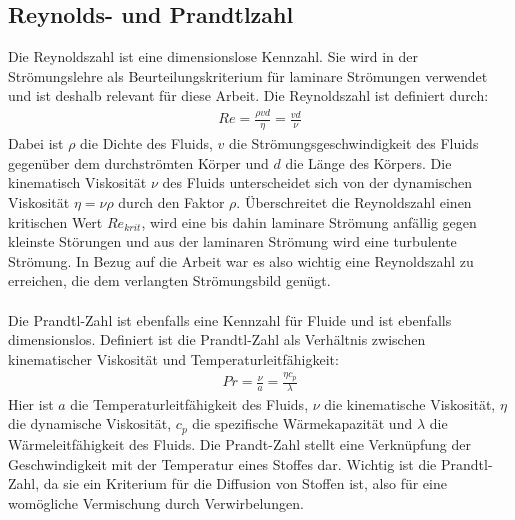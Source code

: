 \subsection{Reynolds- und Prandtlzahl}
Die Reynoldszahl ist eine dimensionslose Kennzahl. Sie wird in der Str\"{o}mungslehre als Beurteilungskriterium f\"{u}r laminare Str\"{o}mungen verwendet und ist deshalb relevant f\"{u}r diese Arbeit. Die Reynoldszahl ist definiert durch:
\begin{align*}
{Re} = \frac{\rho vd}{\eta} = \frac{vd}{\nu}
\end{align*}
Dabei ist \(\rho\) die Dichte des Fluids, \(v\) die Str\"{o}mungsgeschwindigkeit des Fluids gegen\"{u}ber dem durchstr\"{o}mten K\"{o}rper und \(d\) die L\"{a}nge des K\"{o}rpers. Die kinematisch Viskosit\"{a}t \(\nu\) des Fluids unterscheidet sich von der dynamischen Viskosit\"{a}t \(\eta = \nu \rho\) durch den Faktor \(\rho\). \"{U}berschreitet die Reynoldszahl einen kritischen Wert \({Re}_{krit}\), wird eine bis dahin laminare Str\"{o}mung anf\"{a}llig gegen kleinste St\"{o}rungen und aus der laminaren Str\"{o}mung wird eine turbulente Str\"{o}mung. In Bezug auf die Arbeit war es also wichtig eine Reynoldszahl zu erreichen, die dem verlangten Str\"{o}mungsbild gen\"{u}gt\cite{reynolds}.
\\\\
Die Prandtl-Zahl ist ebenfalls eine Kennzahl f\"{u}r Fluide und ist ebenfalls dimensionslos. Definiert ist die Prandtl-Zahl als Verh\"{a}ltnis zwischen kinematischer Viskosit\"{a}t und Temperaturleitf\"{a}higkeit:
\begin{align*}
{Pr} = \frac{\nu}{a} = \frac{\eta c_p}{\lambda}
\end{align*}
Hier ist \(a\) die Temperaturleitf\"{a}higkeit des Fluids, \(\nu\) die kinematische Viskosit\"{a}t, \(\eta\) die dynamische Viskosit\"{a}t, \(c_p\) die spezifische W\"{a}rmekapazit\"{a}t und \(\lambda\) die W\"{a}rmeleitf\"{a}higkeit des Fluids. Die Prandt-Zahl stellt eine Verkn\"{u}pfung der Geschwindigkeit mit der Temperatur eines Stoffes dar. Wichtig ist die Prandtl-Zahl, da sie ein Kriterium f\"{u}r die Diffusion von Stoffen ist, also f\"{u}r eine wom\"{o}gliche Vermischung durch Verwirbelungen\cite{prandtl}.